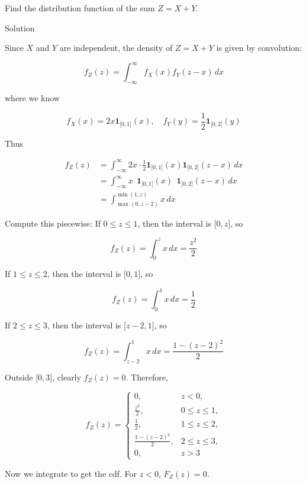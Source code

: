 \documentclass{qlnotes-export}
\begin{document}
Find the distribution function of the sum \(Z = X + Y\).

\begin{qlsolution}{Solution}

Since \(X\) and \(Y\) are independent, the density of \(Z = X + Y\) is given by convolution:

\[f_{Z}(z) = \int_{- \infty}^{\infty}f_{X}(x)f_{Y}(z - x)\, dx\]

where we know

\[f_{X}(x) = 2x\mathbf{1}_{\lbrack 0,1\rbrack}(x),\quad f_{Y}(y) = \frac{1}{2}\mathbf{1}_{\lbrack 0,2\rbrack}(y)\]

Thus

\[\begin{matrix}
{f_{Z}(z)} & {= \int_{- \infty}^{\infty}2x \cdot \frac{1}{2}\mathbf{1}_{\lbrack 0,1\rbrack}(x)\mathbf{1}_{\lbrack 0,2\rbrack}(z - x)\, dx} \\
 & {= \int_{- \infty}^{\infty}x\ \ \mathbf{1}_{\lbrack 0,1\rbrack}(x)\ \ \mathbf{1}_{\lbrack 0,2\rbrack}(z - x)\, dx} \\
 & {= \int_{\max(0,z - 2)}^{\min(1,z)}x\, dx}
\end{matrix}\]

Compute this piecewise: If \(0 \leq z \leq 1\), then the interval is \(\lbrack 0,z\rbrack\), so

\[f_{Z}(z) = \int_{0}^{z}x\, dx = \frac{z^{2}}{2}\]

If \(1 \leq z \leq 2\), then the interval is \(\lbrack 0,1\rbrack\), so

\[f_{Z}(z) = \int_{0}^{1}x\, dx = \frac{1}{2}\]

If \(2 \leq z \leq 3\), then the interval is \(\lbrack z - 2,1\rbrack\), so

\[f_{Z}(z) = \int_{z - 2}^{1}x\, dx = \frac{1 - (z - 2)^{2}}{2}\]

Outside \(\lbrack 0,3\rbrack\), clearly \(f_{Z}(z) = 0\). Therefore,

\[f_{Z}(z) = \left\{ \begin{matrix}
{0,} & {z < 0,} \\
{\frac{z^{2}}{2},} & {0 \leq z \leq 1,} \\
{\frac{1}{2},} & {1 \leq z \leq 2,} \\
{\frac{1 - (z - 2)^{2}}{2},} & {2 \leq z \leq 3,} \\
{0,} & {z > 3}
\end{matrix} \right.\]

Now we integrate to get the cdf. For \(z < 0\), \(F_{Z}(z) = 0\).


\end{qlsolution}
\end{document}
